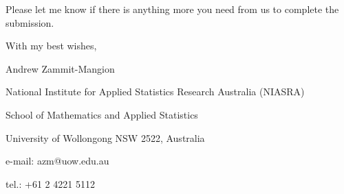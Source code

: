 \documentclass[english]{letter}
\begin{document}
Please let me know if there is anything more you need from us to complete the submission.

 With my best wishes,

 \vspace{0.2in}

Andrew Zammit-Mangion

\vspace{-0.1in}

National Institute for Applied Statistics Research Australia (NIASRA)

\vspace{-0.1in}

School of Mathematics and Applied Statistics

\vspace{-0.1in}

University of Wollongong NSW 2522, Australia

\vspace{-0.1in}

e-mail: azm@uow.edu.au

\vspace{-0.1in}

tel.: +61 2 4221 5112
\end{document}
